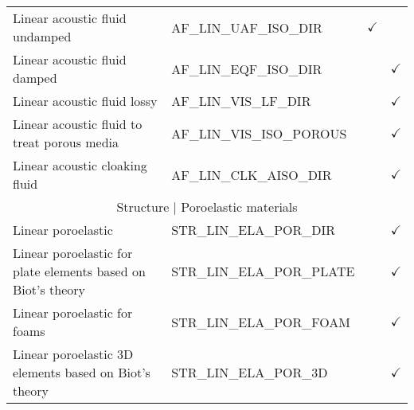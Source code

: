 \begin{longtable}{p{6cm}p{6cm}cc}
    Linear acoustic fluid undamped                                                                             & AF\_LIN\_UAF\_ISO\_DIR            & $\checkmark$                    &                                     \\
    Linear acoustic fluid damped                                                                               & AF\_LIN\_EQF\_ISO\_DIR            &                                 & $\checkmark$                        \\
    Linear acoustic fluid lossy                                                                                & AF\_LIN\_VIS\_LF\_DIR             &                                 & $\checkmark$                        \\
    Linear acoustic fluid to treat porous   media                                                              & AF\_LIN\_VIS\_ISO\_POROUS         &                                 & $\checkmark$                        \\
    Linear acoustic cloaking fluid                                                                             & AF\_LIN\_CLK\_AISO\_DIR           &                                 & $\checkmark$                        \\\hline
    \multicolumn{4}{c}{Structure |   Poroelastic materials}                                                                                                                                                                \\\hline
    Linear poroelastic                                                                                         & STR\_LIN\_ELA\_POR\_DIR           &                                 & $\checkmark$                        \\
    Linear poroelastic for plate elements   based on Biot's theory                                             & STR\_LIN\_ELA\_POR\_PLATE         &                                 & $\checkmark$                        \\
    Linear poroelastic for foams                                                                               & STR\_LIN\_ELA\_POR\_FOAM          &                                 & $\checkmark$                        \\
    Linear poroelastic 3D elements based on   Biot's theory                                                    & STR\_LIN\_ELA\_POR\_3D            &                                 & $\checkmark$                        \\

\end{longtable}
